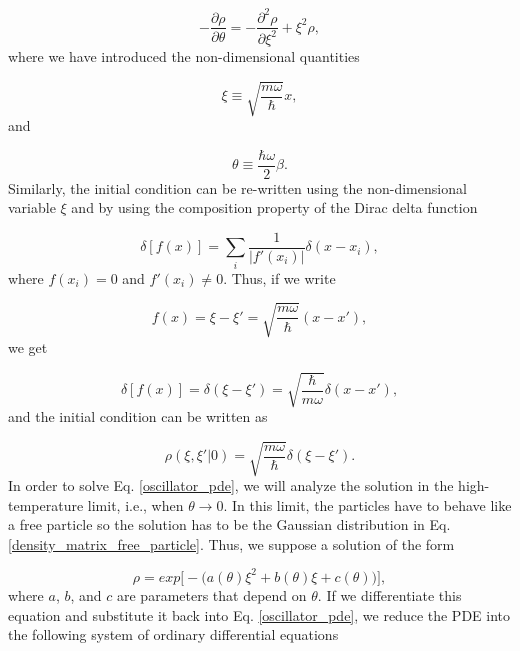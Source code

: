 \documentclass{article}
\begin{document}
\begin{equation}\label{oscillator_pde}
    -\frac{\partial \rho}{\partial \theta} = -\frac{\partial^{2} \rho}{\partial \xi^{2}} + \xi^{2}\rho,
\end{equation}
%
where we have introduced the non-dimensional quantities

\begin{equation}
    \xi \equiv \sqrt{\frac{m \omega}{\hbar}} x,
\end{equation}
%
and

\begin{equation}
    \theta \equiv \frac{\hbar \omega}{2} \beta.
\end{equation}
%
Similarly, the initial condition can be re-written using the non-dimensional variable $\xi$ and by using the composition property of the Dirac delta function

\begin{equation}
    \delta[f(x)] = \sum_{i}\frac{1}{|f'(x_{i})|} \delta(x-x_{i}),
\end{equation}
%
where $f(x_{i})=0$ and $f'(x_i)\neq0$. Thus, if we write

\begin{equation}
    f(x)=\xi-\xi'=\sqrt{\frac{m\omega}{\hbar}}(x-x'),
\end{equation}
%
we get

\begin{equation}
    \delta[f(x)] = \delta(\xi-\xi')=\sqrt{\frac{\hbar}{m\omega}}\delta(x-x'),
\end{equation}
%
and the initial condition can be written as

\begin{equation}\label{oscillator_pde_initial_condition}
    \rho(\xi,\xi'|0) = \sqrt{\frac{m\omega}{\hbar}} \delta(\xi-\xi').
\end{equation}
%
In order to solve Eq. \ref{oscillator_pde}, we will analyze the solution in the high-temperature limit, i.e., when $\theta \longrightarrow 0$. In this limit, the particles have to behave like a free particle so the solution has to be the Gaussian distribution in Eq. \ref{density_matrix_free_particle}. Thus, we suppose a solution of the form

\begin{equation}\label{oscillator_pre_solution}
    \rho = exp\big[-\big(a(\theta)\xi^{2} + b(\theta)\xi + c(\theta)\big)\big],
\end{equation}
%
where $a$, $b$, and $c$ are parameters that depend on $\theta$. If we differentiate this equation and substitute it back into Eq. \ref{oscillator_pde}, we reduce the PDE into the following system of ordinary differential equations
\end{document}
